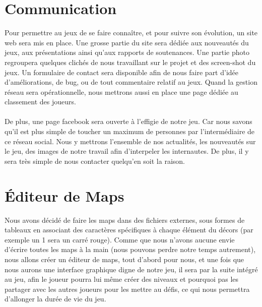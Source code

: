 \documentclass [11pt]{report}
\begin{document}
	\section {Communication}
		Pour permettre au jeux de se faire conna\^itre, et pour suivre son \'evolution, un site web sera mis en place. Une grosse partie du site sera dédiée aux nouveautés du jeux, aux présentations ainsi qu'aux rapports de soutenances. Une partie photo regroupera quelques clichés de nous travaillant sur le projet et des screen-shot du 		jeux. Un formulaire de contact sera disponible afin de nous faire part d'idée d'am\'eliorations, de bug, ou de tout commentaire relatif au jeux. Quand la gestion réseau sera opérationnelle, nous mettrons aussi en place une page dédiée au classement des joueurs.
	\\
	\\
	 \indent De plus, une page facebook sera ouverte à l'effigie de notre jeu. Car nous savons qu'il est plus simple de toucher un maximum de personnes par l'intermédiaire de ce réseau social. Nous y mettrons l'ensemble de nos actualités, les nouveautés sur le jeu, des images de notre travail afin d'interpeler les internautes. De plus, il y sera 		très simple de nous contacter quelqu'en soit la raison.\\\vspace{5mm}

	\section {\'Editeur de Maps}
		Nous avons décidé de faire les maps dans des fichiers externes, sous formes de tableaux en associant des caractères spécifiques à chaque élément du décors (par exemple un 1 sera un carré rouge). Comme que nous n'avons aucune envie d'écrire toutes les maps à la main (nous pouvons perdre notre temps autrement), nous 		allons créer un éditeur de maps, tout d'abord pour nous, et une fois que nous aurons une interface graphique digne de notre jeu, il sera par la suite intégré au jeu, afin le joueur pourra lui même créer des niveaux et pourquoi pas les partager avec les autres joueurs pour les mettre au défis, ce qui nous permettra d'allonger la durée de 		vie du jeu.\\\vspace{5mm}
\end{document}
